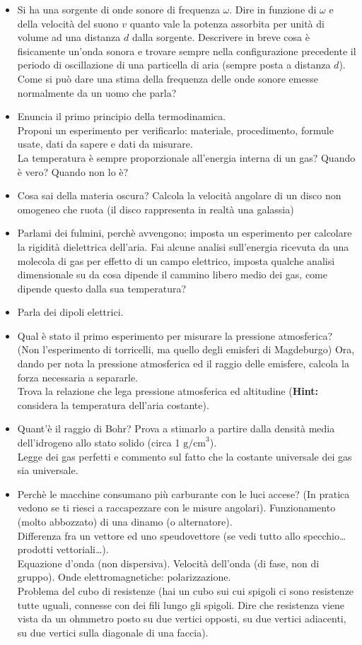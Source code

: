 \documentclass[a4paper,11pt]{article}
\newcommand{\Hint}{{\bf Hint: }}
\begin{document}
\begin{itemize}
\item Si ha una sorgente di onde sonore di frequenza $\omega$. Dire in funzione di $\omega$ e della velocit\`a del suono $v$ quanto vale la potenza assorbita per unit\`a di volume ad una distanza $d$ dalla sorgente. Descrivere in breve cosa \`e fisicamente un'onda sonora e trovare sempre nella configurazione precedente il periodo di oscillazione di una particella di aria (sempre posta a distanza $d$). Come si pu\`o dare una stima della frequenza delle onde sonore emesse normalmente da un uomo che parla?
\item Enuncia il primo principio della termodinamica. \\ Proponi un esperimento per verificarlo: materiale, procedimento, formule usate, dati da sapere e dati da misurare. \\ La temperatura \`e sempre proporzionale all'energia interna di un gas? Quando \`e vero? Quando non lo \`e?
\item Cosa sai della materia oscura? Calcola la velocit\`a angolare di un disco non omogeneo che ruota (il disco rappresenta in realt\`a una galassia)
\item Parlami dei fulmini, perch\`e avvengono; imposta un esperimento per calcolare la rigidit\`a dielettrica dell'aria. Fai alcune analisi sull'energia ricevuta da una molecola di gas per effetto di un campo elettrico, imposta qualche analisi dimensionale su da cosa dipende il cammino libero medio dei gas, come dipende questo dalla sua temperatura?
\item Parla dei dipoli elettrici.
\item Qual \`e stato il primo esperimento per misurare la pressione atmosferica? (Non l'esperimento di torricelli, ma quello degli emisferi di Magdeburgo) Ora, dando per nota la pressione atmosferica ed il raggio delle emisfere, calcola la forza necessaria a separarle. \\ Trova la relazione che lega pressione atmosferica ed altitudine (\Hint considera la temperatura dell'aria costante).
\item Quant'\`e il raggio di Bohr? Prova a stimarlo a partire dalla densit\`a media dell'idrogeno allo stato solido (circa 1 $\mbox{g/cm}^3$). \\ Legge dei gas perfetti e commento sul fatto che la costante universale dei gas sia universale.
\item Perch\`e le macchine consumano pi\`u carburante con le luci accese? (In pratica vedono se ti riesci a raccapezzare con le misure angolari). Funzionamento (molto abbozzato) di una dinamo (o alternatore). \\ Differenza fra un vettore ed uno speudovettore (se vedi tutto allo specchio\ldots prodotti vettoriali\ldots). \\ Equazione d'onda (non dispersiva). Velocit\`a dell'onda (di fase, non di gruppo). Onde elettromagnetiche: polarizzazione. \\ Problema del cubo di resistenze (hai un cubo sui cui spigoli ci sono resistenze tutte uguali, connesse con dei fili lungo gli spigoli. Dire che resistenza viene vista da un ohmmetro posto su due vertici opposti, su due vertici adiacenti, su due vertici sulla diagonale di una faccia).

\end{itemize}
\end{document}
